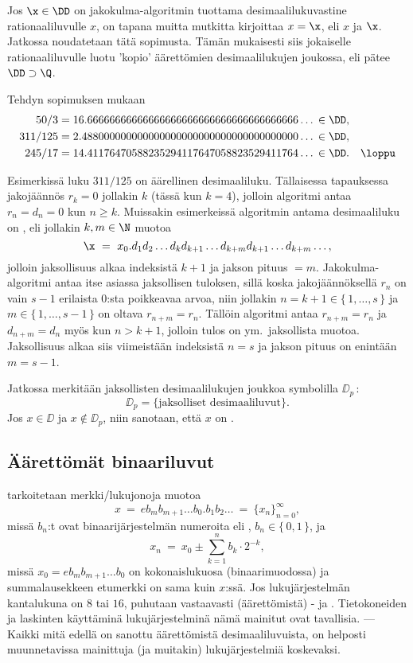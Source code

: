 Jos $\x\in\DD$ on jakokulma-algoritmin tuottama desimaalilukuvastine rationaaliluvulle $x$, on
tapana muitta mutkitta kirjoittaa $x = \x$, eli  $x$ ja $\x$. Jatkossa
noudatetaan tätä sopimusta. Tämän mukaisesti siis jokaiselle rationaaliluvulle luotu 'kopio'
äärettömien desimaalilukujen joukossa, eli pätee $\DD \supset \Q$.
\begin{Exa} Tehdyn sopimuksen mukaan
\begin{align*}
50/3    &= 16.66666666666666666666666666666666666666 \ldots\,\in \DD, \\
311/125 &= 2.488000000000000000000000000000000000000 \ldots\,\in \DD, \\
245/17  &= 14.41176470588235294117647058823529411764 \ldots\,\in \DD. \quad\loppu 
\end{align*} \end{Exa}
Esimerkissä luku $311/125$ on äärellinen desimaaliluku. Tällaisessa tapauksessa jakojäännös
$r_k = 0$ jollakin $k$ (tässä kun $k=4$), jolloin algoritmi antaa $r_n = d_n = 0$ kun $n \ge k$.
%
Muissakin esimerkeissä algoritmin antama desimaaliluku on , eli jollakin
$k,m \in \N$ muotoa
\[
\x\ =\ x_0.d_1 d_2 \ldots d_k d_{k+1} \ldots d_{k+m} d_{k+1} \ldots d_{k+m} \ldots,
\]
jolloin jaksollisuus alkaa indeksistä $k+1$ ja jakson pituus $=m$. Jakokulma-algoritmi antaa 
itse asiassa  jaksollisen tuloksen, sillä koska jakojäännöksellä $r_n$ on vain $s-1$
erilaista $0$:sta poikkeavaa arvoa, niin jollakin $n=k+1\in \{\,1, \ldots,s\,\}$ ja 
$m \in \{\,1, \ldots, s-1\,\}$ on oltava $r_{n+m} = r_{n}$. Tällöin algoritmi antaa 
$r_{n+m} = r_n$ ja $d_{n+m} = d_n$ myös kun $n > k+1$, jolloin tulos on ym.\ jaksollista muotoa.
Jaksollisuus alkaa siis viimeistään indeksistä $n=s$ ja jakson pituus on enintään $m=s-1$. 

Jatkossa merkitään jaksollisten desimaalilukujen joukkoa symbolilla $\DD_p\,$:
\[
\DD_p = \{\text{jaksolliset desimaaliluvut}\}.
\]
%
Jos $x\in\DD$ ja $x\not\in\DD_p$, niin sanotaan, että $x$ on .

\subsection*{Äärettömät binaariluvut}
%

 tarkoitetaan merkki/lukujonoja muotoa
\[
x\ =\ eb_m b_{m+1} \ldots b_0 . b_1 b_2 \ldots\ =\ \{x_n\}_{n=0}^{\infty},
\]
%
missä $b_n$:t ovat binaarijärjestelmän numeroita eli , $b_n \in \{\,0,1\,\}$, ja
\[
x_n\ =\ x_0 \pm \sum_{k=1}^n b_k \cdot 2^{-k},
\]
missä $x_0 = e b_m b_{m+1} \ldots b_0$ on kokonaislukuosa (binaarimuodossa) ja summalausekkeen
etumerkki on sama kuin $x$:ssä. Jos lukujärjestelmän kantalukuna on $8$ tai $16$, puhutaan 
vastaavasti (äärettömistä) - ja . Tietokoneiden ja 
laskinten käyttäminä lukujärjestelminä nämä mainitut ovat tavallisia. --- Kaikki mitä edellä
on sanottu äärettömistä desimaaliluvuista, on helposti muunnetavissa mainittuja (ja muitakin)
lukujärjestelmiä koskevaksi.

